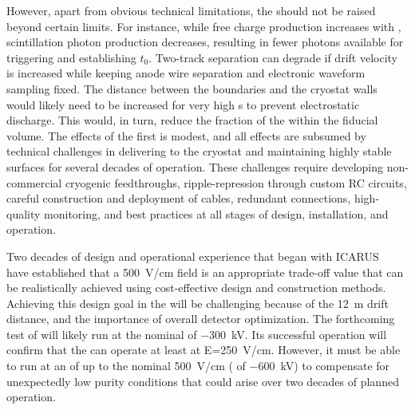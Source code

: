 However, apart from obvious technical limitations, the \efield should not be raised beyond certain limits. For instance, while free charge production increases with \efield, scintillation photon production decreases, resulting in fewer photons available for triggering and establishing $t_{0}$. %
Two-track separation can degrade if drift velocity is increased while keeping anode wire separation and electronic waveform sampling fixed. The distance between the  boundaries and the cryostat walls would likely need to be increased for very high \efield{}s to prevent electrostatic discharge. This would, in turn, reduce the fraction of the  within the fiducial volume. The effects of the first   is modest, and all effects are subsumed by technical challenges in delivering  to the cryostat and maintaining highly stable  surfaces for several decades of operation.  These challenges require developing non-commercial cryogenic  feedthroughs,  ripple-repression through custom  RC  circuits, careful construction and deployment of  cables, redundant  connections, high-quality monitoring, and best practices at all stages of design, installation, and operation.

Two decades of design and operational experience that began with ICARUS~\cite{icarus} have established that a \SI{500}{\V/\cm} field is an appropriate trade-off value that can be realistically achieved using cost-effective design and construction methods. Achieving this design goal in the  %
will be challenging because of the \SI{12}{m} drift distance, and the importance of overall detector optimization. 
The forthcoming test of  will likely run at the nominal  of \SI{-300}{\kV}. Its successful operation will confirm that the    can operate at least at E=\SI{250}{\V/\cm}. 
However, %
it must be able to run at an \efield of up to the nominal \SI{500}{\V/\cm} %
( of \SI{-600}{\kV}) to compensate for unexpectedly low purity conditions that could arise over two decades of planned operation. 


